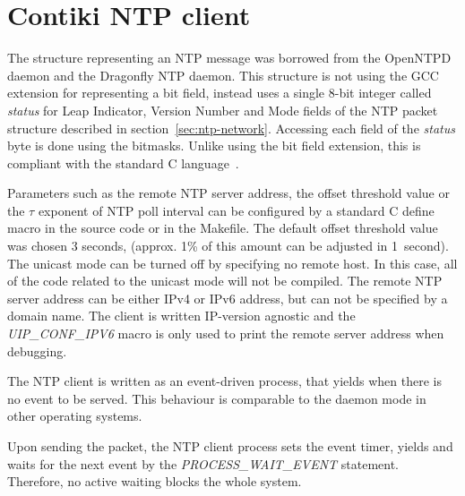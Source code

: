 
\section{Contiki NTP client}
The structure representing an NTP message was borrowed from the OpenNTPD daemon
and the Dragonfly NTP daemon. %
This structure is not using the GCC extension for representing a bit field,
instead uses a single 8-bit integer called {\it{status}}
for Leap Indicator, Version Number and Mode fields of the NTP packet
structure described in section~\ref{sec:ntp-network}.
Accessing each field of the {\it{status}} byte is done using the bitmasks.
Unlike using the bit field extension,
this is compliant with the standard C language~\cite{c99}.

Parameters such as the remote NTP server address, the offset threshold value
or the $\tau$ exponent of NTP poll interval can be configured by a standard C define macro
in the source code or in the Makefile.
The default offset threshold value was chosen 3 seconds,
(approx. 1\% of this amount can be adjusted in 1~second).
The unicast mode can be turned off by specifying no remote host.
In this case, all of the code related to the unicast mode will not be compiled.
The remote NTP server address can be either IPv4 or IPv6 address,
but can not be specified by a domain name.
The client is written IP-version agnostic and the {\it{UIP\_CONF\_IPV6}} macro is only used
to print the remote server address when debugging.

The NTP client is written as an event-driven process,
that yields when there is no event to be served.
This behaviour is comparable to the daemon mode in other operating systems.

Upon sending the packet, the NTP client process sets the event timer,
yields and waits for the next event by the {\it{PROCESS\_WAIT\_EVENT}} statement.
Therefore, no active waiting blocks the whole system.

